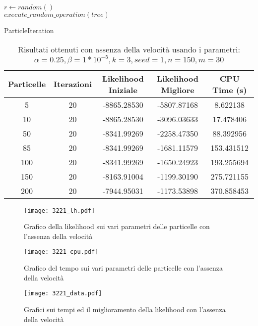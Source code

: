 \begin{algorithm}[!h]
    $r \gets random()$ \\
    $execute\_random\_operation(tree)$
    \caption{ParticleIteration}
    \label{algo:pso-adapt-calculate-1}
\end{algorithm}
\begin{table}[!h]
  \centering
  \begin{tabular}{*{5}{c}}
    Particelle & Iterazioni & Likelihood Iniziale & Likelihood Migliore & CPU Time (s) \\ \midrule \midrule
    5 & 20 & -8865.28530 & -5807.87168 & 8.622138 \\
    10 & 20 & -8865.28530 & -3096.03633 & 17.478406 \\
    50 & 20 & -8341.99269 & -2258.47350 & 88.392956 \\
    85 & 20 & -8341.99269 & -1681.11579 & 153.431512 \\
    100 & 20 & -8341.99269 & -1650.24923 & 193.255694 \\
    150 & 20 & -8163.91004 & -1199.30190 & 275.721155 \\
    200 & 20 & -7944.95031 & -1173.53898 & 370.858453
  \end{tabular}
  \caption{Risultati ottenuti con assenza della velocità usando i parametri: $\alpha = 0.25, \beta = 1*10^{-5}, k = 3, seed = 1, n = 150, m = 30$}
  \label{tab:pso-adapt-calculate-1-table}
\end{table}
\begin{figure}[!h]
  \centering
  \begin{minipage}{.45 \textwidth}
  \centering
  \texttt{[image: 3221\_lh.pdf]}
  \caption{Grafico della likelihood sui vari parametri delle particelle con l'assenza della velocità}
  \end{minipage}
  \begin{minipage}{.45 \textwidth}
    \centering
    \texttt{[image: 3221\_cpu.pdf]}
    \caption{Grafico del tempo sui vari parametri delle particelle con l'assenza della velocità}
  \end{minipage}
  \label{fig:pso-adapt-calculate-1-graph}
\end{figure}
\begin{figure}[!h]
  \centering
  \texttt{[image: 3221\_data.pdf]}
  \caption{Grafici sui tempi ed il miglioramento della likelihood con l'assenza della velocità}
  \label{fig:pso-adapt-calculate-4-data}
\end{figure}
